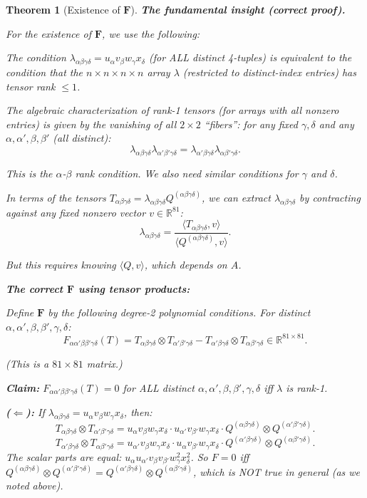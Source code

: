 \documentclass[12pt]{article}
\newtheorem{theorem}{Theorem}
\begin{document}
\begin{theorem}[Existence of $\mathbf{F}$]
\textbf{The fundamental insight (correct proof).}

For the existence of $\mathbf{F}$, we use the following:

The condition $\lambda_{\alpha\beta\gamma\delta} = u_\alpha v_\beta w_\gamma x_\delta$ (for ALL distinct 4-tuples) is equivalent to the condition that the $n \times n \times n \times n$ array $\lambda$ (restricted to distinct-index entries) has tensor rank $\leq 1$.

The algebraic characterization of rank-1 tensors (for arrays with all nonzero entries) is given by the vanishing of all $2\times 2$ ``fibers'': for any fixed $\gamma, \delta$ and any $\alpha, \alpha', \beta, \beta'$ (all distinct):
\[
\lambda_{\alpha\beta\gamma\delta} \lambda_{\alpha'\beta'\gamma\delta} = \lambda_{\alpha'\beta\gamma\delta} \lambda_{\alpha\beta'\gamma\delta}.
\]

This is the $\alpha$-$\beta$ rank condition. We also need similar conditions for $\gamma$ and $\delta$.

In terms of the tensors $T_{\alpha\beta\gamma\delta} = \lambda_{\alpha\beta\gamma\delta} Q^{(\alpha\beta\gamma\delta)}$, we can extract $\lambda_{\alpha\beta\gamma\delta}$ by contracting against any fixed nonzero vector $v \in \mathbb{R}^{81}$:
\[
\lambda_{\alpha\beta\gamma\delta} = \frac{\langle T_{\alpha\beta\gamma\delta}, v\rangle}{\langle Q^{(\alpha\beta\gamma\delta)}, v\rangle}.
\]

But this requires knowing $\langle Q, v\rangle$, which depends on $A$.

\textbf{The correct $\mathbf{F}$ using tensor products:}

Define $\mathbf{F}$ by the following degree-2 polynomial conditions. For distinct $\alpha, \alpha', \beta, \beta', \gamma, \delta$:
\[
F_{\alpha\alpha'\beta\beta'\gamma\delta}(T) = T_{\alpha\beta\gamma\delta} \otimes T_{\alpha'\beta'\gamma\delta} - T_{\alpha'\beta\gamma\delta} \otimes T_{\alpha\beta'\gamma\delta} \in \mathbb{R}^{81 \times 81}.
\]

(This is a $81 \times 81$ matrix.)

\textbf{Claim:} $F_{\alpha\alpha'\beta\beta'\gamma\delta}(T) = 0$ for ALL distinct $\alpha,\alpha',\beta,\beta',\gamma,\delta$ iff $\lambda$ is rank-1.

\textbf{($\Leftarrow$):} If $\lambda_{\alpha\beta\gamma\delta} = u_\alpha v_\beta w_\gamma x_\delta$, then:
\[
T_{\alpha\beta\gamma\delta} \otimes T_{\alpha'\beta'\gamma\delta} = u_\alpha v_\beta w_\gamma x_\delta \cdot u_{\alpha'} v_{\beta'} w_\gamma x_\delta \cdot Q^{(\alpha\beta\gamma\delta)} \otimes Q^{(\alpha'\beta'\gamma\delta)}.
\]
\[
T_{\alpha'\beta\gamma\delta} \otimes T_{\alpha\beta'\gamma\delta} = u_{\alpha'}v_\beta w_\gamma x_\delta \cdot u_\alpha v_{\beta'} w_\gamma x_\delta \cdot Q^{(\alpha'\beta\gamma\delta)} \otimes Q^{(\alpha\beta'\gamma\delta)}.
\]
The scalar parts are equal: $u_\alpha u_{\alpha'} v_\beta v_{\beta'} w_\gamma^2 x_\delta^2$.
So $F = 0$ iff $Q^{(\alpha\beta\gamma\delta)} \otimes Q^{(\alpha'\beta'\gamma\delta)} = Q^{(\alpha'\beta\gamma\delta)} \otimes Q^{(\alpha\beta'\gamma\delta)}$, which is NOT true in general (as we noted above).


\end{theorem}
\end{document}
